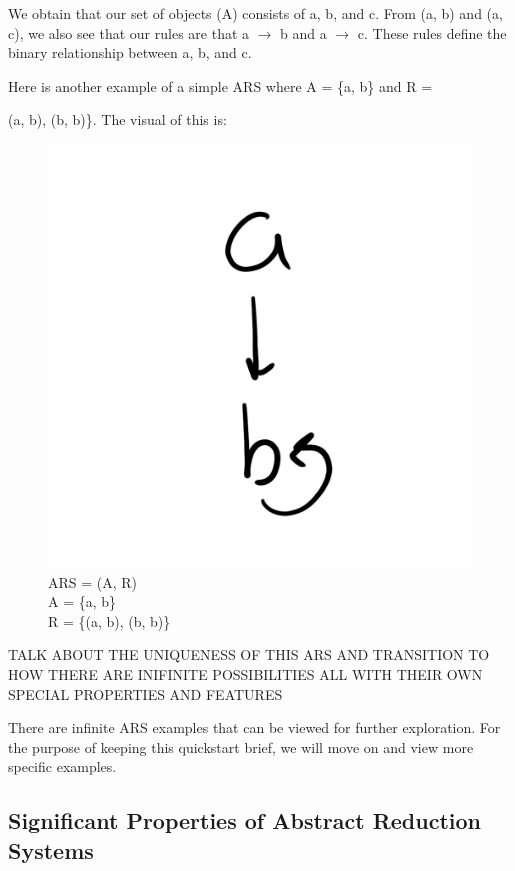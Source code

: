 \documentclass{article}
\begin{document}
\medskip\noindent
We obtain that our set of objects (A) consists of a, b, and c. From (a, b) and (a, c), we also see that our rules are that a $\rightarrow$ b and a $\rightarrow$ c. These rules define the binary relationship between a, b, and c.

\medskip\noindent
Here is another example of a simple ARS where A = \{a, b\} and R = {(a, b), (b, b)\}. The visual of this is:

\begin{figure}[h!]
  \centering
  \includegraphics[scale=0.06]{gen2}
  \caption[] {
     ARS = (A, R) \\ A = \{a, b\} \\ R = \{(a, b), (b, b)\}
    \endtabular}
\end{figure}

\medskip\noindent
TALK ABOUT THE UNIQUENESS OF THIS ARS AND TRANSITION TO HOW THERE ARE INIFINITE POSSIBILITIES ALL WITH THEIR OWN SPECIAL PROPERTIES AND FEATURES

\medskip\noindent
There are infinite ARS examples that can be viewed for further exploration. For the purpose of keeping this quickstart brief, we will move on and view more specific examples.


\subsection{Significant Properties of Abstract Reduction Systems}

}
\end{document}
